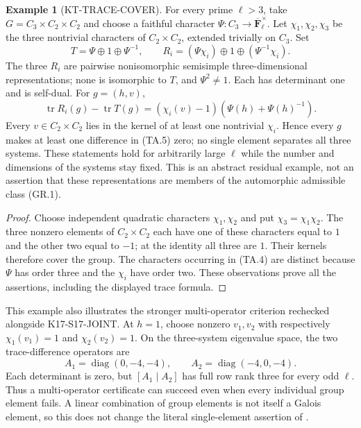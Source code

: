 \documentclass[11pt,a4paper]{article}
\theoremstyle{definition}
\newtheorem{example}[theorem]{Example}
\begin{document}
\begin{example}[KT-TRACE-COVER]
For every prime $\ell>3$, take
$G=C_3\times C_2\times C_2$ and choose a faithful character
$\Psi:C_3\to\overline{\mathbf F}_\ell^\times$.
Let $\chi_1,\chi_2,\chi_3$ be the three nontrivial
characters of $C_2\times C_2$, extended trivially on $C_3$.
Set
\[
 T=\Psi\oplus1\oplus\Psi^{-1},\qquad
 R_i=(\Psi\chi_i)\oplus1\oplus(\Psi^{-1}\chi_i).
                                                               \tag{TA.4}
\]
The three $R_i$ are pairwise nonisomorphic semisimple
three-dimensional representations; none is isomorphic to
$T$, and $\Psi^2\ne1$. Each has determinant one and is
self-dual. For $g=(h,v)$,
\[
 \operatorname{tr}R_i(g)-\operatorname{tr}T(g)
       =(\chi_i(v)-1)(\Psi(h)+\Psi(h)^{-1}).
                                                               \tag{TA.5}
\]
Every $v\in C_2\times C_2$ lies in the kernel of at least
one nontrivial $\chi_i$. Hence every $g$ makes at least
one difference in (TA.5) zero; no single element separates
all three systems. These statements hold for arbitrarily
large $\ell$ while the number and dimensions of the
systems stay fixed. This is an abstract residual example,
not an assertion that these representations are members
of the automorphic admissible class (GR.1).
\end{example}

\begin{proof}
Choose independent quadratic characters $\chi_1,\chi_2$
and put $\chi_3=\chi_1\chi_2$. The three nonzero elements
of $C_2\times C_2$ each have one of these characters equal
to $1$ and the other two equal to $-1$; at the identity
all three are $1$. Their kernels therefore cover the
group. The characters occurring in (TA.4) are distinct
because $\Psi$ has order three and the $\chi_i$ have
order two. These observations prove all the assertions,
including the displayed trace formula.
\end{proof}

This example also illustrates the stronger multi-operator
criterion rechecked alongside K17-S17-JOINT. At $h=1$, choose nonzero
$v_1,v_2$ with respectively $\chi_1(v_1)=1$ and
$\chi_2(v_2)=1$. On the three-system eigenvalue space,
the two trace-difference operators are
\[
 A_1=\operatorname{diag}(0,-4,-4),\qquad
 A_2=\operatorname{diag}(-4,0,-4).
                                                               \tag{TA.6}
\]
Each determinant is zero, but $[A_1\mid A_2]$ has full
row rank three for every odd $\ell$. Thus a multi-operator
certificate can succeed even when every individual group
element fails. A linear combination of group elements is
not itself a Galois element, so this does not change the
literal single-element assertion of .
\end{document}
